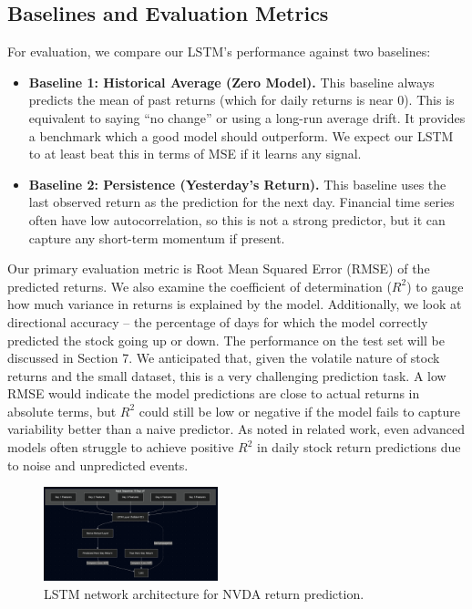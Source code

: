 \documentclass[conference]{IEEEtran}
\begin{document}
\subsection{Baselines and Evaluation Metrics}
For evaluation, we compare our LSTM’s performance against two baselines:
\begin{itemize}
	\item \textbf{Baseline 1: Historical Average (Zero Model).} This baseline always predicts the mean of past returns (which for daily returns is near 0). This is equivalent to saying “no change” or using a long-run average drift. It provides a benchmark which a good model should outperform. We expect our LSTM to at least beat this in terms of MSE if it learns any signal.
	\item \textbf{Baseline 2: Persistence (Yesterday’s Return).} This baseline uses the last observed return as the prediction for the next day. Financial time series often have low autocorrelation, so this is not a strong predictor, but it can capture any short-term momentum if present.
\end{itemize}
Our primary evaluation metric is Root Mean Squared Error (RMSE) of the predicted returns. We also examine the coefficient of determination ($R^2$) to gauge how much variance in returns is explained by the model. Additionally, we look at directional accuracy – the percentage of days for which the model correctly predicted the stock going up or down. The performance on the test set will be discussed in Section 7. We anticipated that, given the volatile nature of stock returns and the small dataset, this is a very challenging prediction task. A low RMSE would indicate the model predictions are close to actual returns in absolute terms, but $R^2$ could still be low or negative if the model fails to capture variability better than a naive predictor. As noted in related work, even advanced models often struggle to achieve positive $R^2$ in daily stock return predictions due to noise and unpredicted events.

\begin{figure}[ht]
	\centering
	\includegraphics[width=0.45\textwidth]{lstm_architecture.png}
	\caption{LSTM network architecture for NVDA return prediction.}
	\label{fig:lstm_architecture}
\end{figure}
\end{document}
